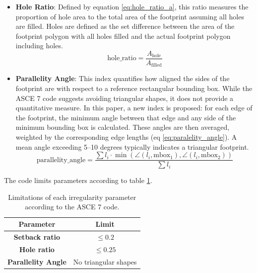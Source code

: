 \begin{refsection}
\begin{itemize}
    The computation of the setback ratio aligns with the Italian GNDT code, with modifications to the sides used in the formula as illustrated in figure \ref{fig:NTC_setback_ratio}. The setback ratio is set to the minimum of $b1/L1$ and $b2/L2$. Taking the minimum ensures that the setback is relevant in both directions, effectively filtering out very thin or negligible setbacks.

    \item \textbf{Hole Ratio}: Defined by equation \ref{eq:hole_ratio_a}, this ratio measures the proportion of hole area to the total area of the footprint assuming all holes are filled. Holes are defined as the set difference between the area of the footprint polygon with all holes filled and the actual footprint polygon including holes.
    \begin{equation}
        \label{eq:hole_ratio_a}
        \text{hole\_ratio} = \frac{A_{\text{hole}}}{A_{\text{filled}}}    
    \end{equation}
    
    \item \textbf{Parallelity Angle}: This index quantifies how aligned the sides of the footprint are with respect to a reference rectangular bounding box. While the ASCE 7 code suggests avoiding triangular shapes, it does not provide a quantitative measure. In this paper, a new index is proposed: for each edge of the footprint, the minimum angle between that edge and any side of the minimum bounding box is calculated. These angles are then averaged, weighted by the corresponding edge lengths (eq \ref{eq:paralelity_angle}). A mean angle exceeding 5–10 degrees typically indicates a triangular footprint.
    \begin{equation}
        \label{eq:paralelity_angle}
        \text{parallelity\_angle} = \frac{\sum l_i \cdot \min\left(\angle(l_i,\text{mbox}_1),\angle(l_i,\text{mbox}_2)\right)}{\sum l_i}    
    \end{equation}
\end{itemize}


The code limits parameters according to table \ref{tab:asce_limits}.

\begin{table}[htbp]
    \centering
    \caption{Limitations of each irregularity parameter according to the ASCE 7 code.}
    \begin{tabular}{|c|c|}
        \hline
        \textbf{Parameter} & \textbf{Limit}\\
        \hline
        \textbf{Setback ratio} & $\leq 0.2$\\
        \hline
        \textbf{Hole ratio}  & $\leq 0.25$\\
        \hline
        \textbf{Parallelity Angle}  & No triangular shapes\\
        \hline
    \end{tabular}
    \label{tab:asce_limits}
\end{table}


\end{refsection}
